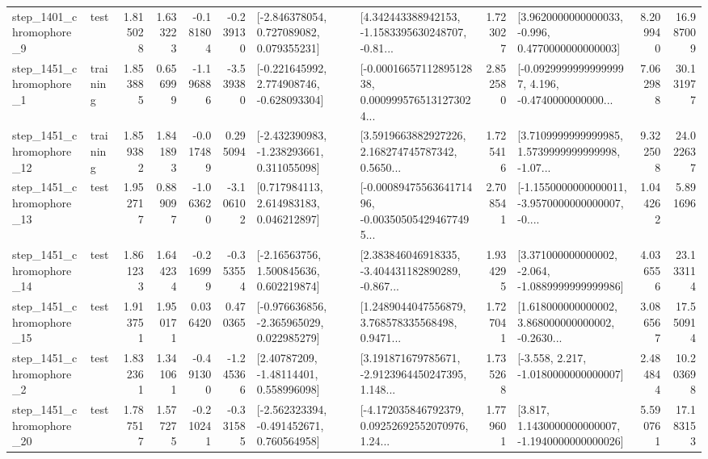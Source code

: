 \begin{tabular}{llrrrrllrlrr}
  step\_1401\_chromophore\_9 &      test &      1.815028 &    1.633223 &     -0.181804 & -0.239130 &    [-2.846378054, 0.727089082, 0.079355231] &  [4.342443388942153, -1.1583395630248707, -0.81... &       1.723027 &   [3.9620000000000033, -0.996, 0.4770000000000003] &            8.209940 &         16.987009 \\
  step\_1451\_chromophore\_1 &  training &      1.853885 &    0.656999 &     -1.196886 & -3.539380 &   [-0.221645992, 2.774908746, -0.628093304] &  [-0.0001665711289512838, 0.0009995765131273024... &       2.852580 &  [-0.09299999999999997, 4.196, -0.4740000000000... &            7.062988 &         30.131977 \\
 step\_1451\_chromophore\_12 &  training &      1.859382 &    1.841893 &     -0.017489 &  0.295094 &   [-2.432390983, -1.238293661, 0.311055098] &  [3.5919663882927226, 2.168274745787342, 0.5650... &       1.725416 &  [3.7109999999999985, 1.5739999999999998, -1.07... &            9.322508 &         24.022637 \\
 step\_1451\_chromophore\_13 &      test &      1.952717 &    0.889097 &     -1.063620 & -3.106102 &     [0.717984113, 2.614983183, 0.046212897] &  [-0.0008947556364171496, -0.003505054294677495... &       2.708541 &  [-1.1550000000000011, -3.9570000000000007, -0.... &            1.044262 &          5.891696 \\
 step\_1451\_chromophore\_14 &      test &      1.861233 &    1.644234 &     -0.216999 & -0.353554 &     [-2.16563756, 1.500845636, 0.602219874] &  [2.383846046918335, -3.404431182890289, -0.867... &       1.934295 &   [3.371000000000002, -2.064, -1.0889999999999986] &            4.036556 &         23.133114 \\
 step\_1451\_chromophore\_15 &      test &      1.913751 &    1.950171 &      0.036420 &  0.470365 &   [-0.976636856, -2.365965029, 0.022985279] &  [1.2489044047556879, 3.768578335568498, 0.9471... &       1.727041 &  [1.618000000000002, 3.868000000000002, -0.2630... &            3.086567 &         17.550914 \\
  step\_1451\_chromophore\_2 &      test &      1.832361 &    1.341061 &     -0.491300 & -1.245366 &      [2.40787209, -1.48114401, 0.558996098] &  [3.191871679785671, -2.9123964450247395, 1.148... &       1.735268 &               [-3.558, 2.217, -1.0180000000000007] &            2.484844 &         10.203698 \\
 step\_1451\_chromophore\_20 &      test &      1.787517 &    1.577275 &     -0.210241 & -0.331585 &   [-2.562323394, -0.491452671, 0.760564958] &  [-4.172035846792379, 0.09252692552070976, 1.24... &       1.779601 &   [3.817, 1.1430000000000007, -1.1940000000000026] &            5.590761 &         17.183153 \\

\end{tabular}
